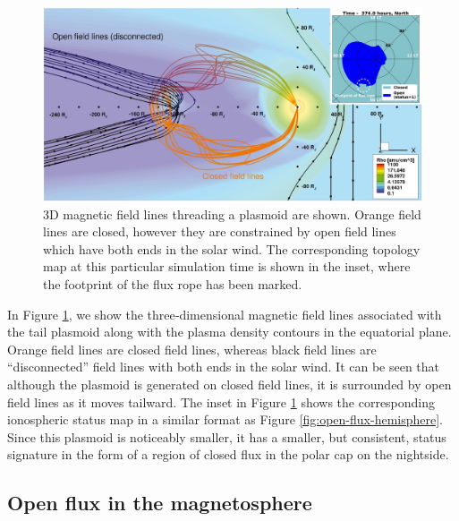 \begin{figure}
    \centering
    \includegraphics[width=\textwidth]{images4/plasmoid-3d-inset.jpg}
    \caption{3D magnetic field lines threading a plasmoid are shown. Orange field lines are closed, however they are constrained by open field lines which have both ends in the solar wind. The corresponding topology map at this particular simulation time is shown in the inset, where the footprint of the flux rope has been marked.}
    \label{fig:plasmoid-3d-inset}
\end{figure}

In Figure \ref{fig:plasmoid-3d-inset}, we show the three‐dimensional magnetic field lines associated with the tail plasmoid along with the plasma density contours in the equatorial plane. Orange field lines are closed field lines, whereas black field lines are “disconnected” field lines with both ends in the solar wind. It can be seen that although the plasmoid is generated on closed field lines, it is surrounded by open field lines as it moves tailward. The inset in Figure \ref{fig:plasmoid-3d-inset} shows the corresponding ionospheric status map in a similar format as Figure \ref{fig:open-flux-hemisphere}. Since this plasmoid is noticeably smaller, it has a smaller, but consistent, status signature in the form of a region of closed flux in the polar cap on the nightside. 

\subsection{Open flux in the magnetosphere}

